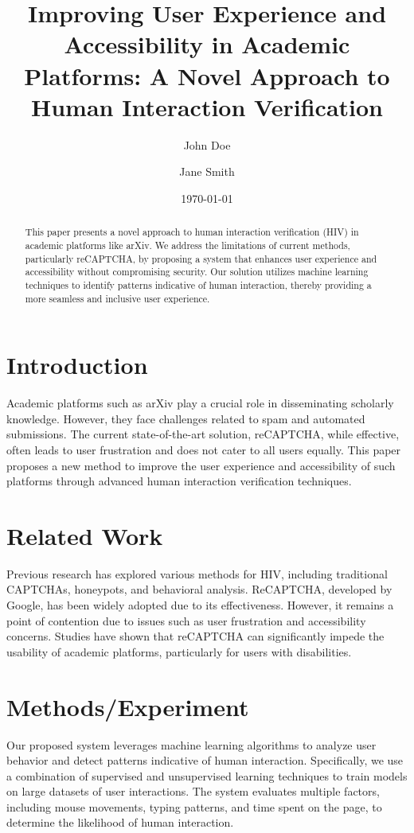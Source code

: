 \documentclass{article}
\title{Improving User Experience and Accessibility in Academic Platforms: A Novel Approach to Human Interaction Verification}
\author{John Doe \and Jane Smith}
\date{\today}
\begin{document}
\maketitle

\begin{abstract}
This paper presents a novel approach to human interaction verification (HIV) in academic platforms like arXiv. We address the limitations of current methods, particularly reCAPTCHA, by proposing a system that enhances user experience and accessibility without compromising security. Our solution utilizes machine learning techniques to identify patterns indicative of human interaction, thereby providing a more seamless and inclusive user experience.
\end{abstract}

\section{Introduction}
Academic platforms such as arXiv play a crucial role in disseminating scholarly knowledge. However, they face challenges related to spam and automated submissions. The current state-of-the-art solution, reCAPTCHA, while effective, often leads to user frustration and does not cater to all users equally. This paper proposes a new method to improve the user experience and accessibility of such platforms through advanced human interaction verification techniques.

\section{Related Work}
Previous research has explored various methods for HIV, including traditional CAPTCHAs, honeypots, and behavioral analysis. ReCAPTCHA, developed by Google, has been widely adopted due to its effectiveness. However, it remains a point of contention due to issues such as user frustration and accessibility concerns. Studies have shown that reCAPTCHA can significantly impede the usability of academic platforms, particularly for users with disabilities.

\section{Methods/Experiment}
Our proposed system leverages machine learning algorithms to analyze user behavior and detect patterns indicative of human interaction. Specifically, we use a combination of supervised and unsupervised learning techniques to train models on large datasets of user interactions. The system evaluates multiple factors, including mouse movements, typing patterns, and time spent on the page, to determine the likelihood of human interaction.
\end{document}
